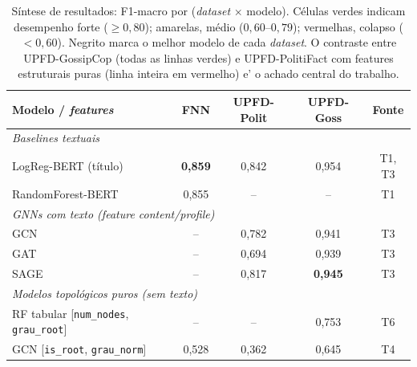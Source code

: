 \begin{table}[H]\centering
\caption[S\'intese de resultados: F1-macro por \emph{dataset} $\times$ modelo]{S\'intese de resultados: F1-macro por (\emph{dataset} $\times$ modelo). C\'elulas verdes indicam desempenho forte ($\geq 0{,}80$); amarelas, m\'edio ($0{,}60$--$0{,}79$); vermelhas, colapso ($<0{,}60$). Negrito marca o melhor modelo de cada \emph{dataset}. O contraste entre UPFD-GossipCop (todas as linhas verdes) e UPFD-PolitiFact com features estruturais puras (linha inteira em vermelho) e' o achado central do trabalho.}
\label{tab:sintese_resultados}
\small
\setlength{\tabcolsep}{6pt}
\renewcommand{\arraystretch}{1.2}
\begin{tabular}{l|ccc|c}
\toprule
\textbf{Modelo / \emph{features}} & \textbf{FNN} & \textbf{UPFD-Polit} & \textbf{UPFD-Goss} & \textbf{Fonte} \\
\midrule
\multicolumn{5}{l}{\textit{Baselines textuais}} \\
\midrule
LogReg-BERT (t\'itulo) & \cellcolor{cgood}\textbf{0{,}859} & \cellcolor{cgood}0{,}842 & \cellcolor{cgood}0{,}954 & T1, T3 \\
RandomForest-BERT      & \cellcolor{cgood}0{,}855 & --     & --     & T1 \\
\midrule
\multicolumn{5}{l}{\textit{GNNs com texto (\emph{feature} content/profile)}} \\
\midrule
GCN  & --     & \cellcolor{cmed}0{,}782 & \cellcolor{cgood}0{,}941 & T3 \\
GAT  & --     & \cellcolor{cmed}0{,}694 & \cellcolor{cgood}0{,}939 & T3 \\
SAGE & --     & \cellcolor{cgood}0{,}817 & \cellcolor{cgood}\textbf{0{,}945} & T3 \\
\midrule
\multicolumn{5}{l}{\textit{Modelos topol\'ogicos puros (sem texto)}} \\
\midrule
RF tabular {\scriptsize[\texttt{num\_nodes}, \texttt{grau\_root}]} & --     & --     & \cellcolor{cmed}0{,}753 & T6 \\
GCN  {\scriptsize[\texttt{is\_root}, \texttt{grau\_norm}]}         & \cellcolor{cbad}0{,}528 & \cellcolor{cbad}0{,}362 & \cellcolor{cmed}0{,}645 & T4 \\

\end{tabular}
\end{table}
